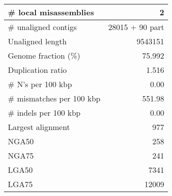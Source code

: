 \documentclass[12pt,a4paper]{article}
\begin{document}
\begin{table}[ht]
\begin{center}
\begin{tabular}{|l*{1}{|r}|}
\# local misassemblies & 2 \\ \hline
\# unaligned contigs & 28015 + 90 part \\ \hline
Unaligned length & 9543151 \\ \hline
Genome fraction (\%) & 75.992 \\ \hline
Duplication ratio & 1.516 \\ \hline
\# N's per 100 kbp & 0.00 \\ \hline
\# mismatches per 100 kbp & 551.98 \\ \hline
\# indels per 100 kbp & 0.00 \\ \hline
Largest alignment & 977 \\ \hline
NGA50 & 258 \\ \hline
NGA75 & 241 \\ \hline
LGA50 & 7341 \\ \hline
LGA75 & 12009 \\ \hline
\end{tabular}
\end{center}
\end{table}
\end{document}
